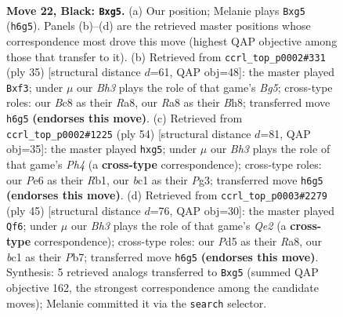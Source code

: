 \documentclass[11pt]{article}
\begin{document}
\clearpage

\begin{figure}[p]\centering
\begin{subfigure}{0.46\textwidth}\centering
\resizebox{\linewidth}{!}{%
\newchessgame
\chessboard[
  setfen={rnbqk3/p7/2p1p1pb/P1PpP1N1/1P3P2/2P5/8/R1BQK1N1 b Qq - 3 22},
  showmover=false,
  pgfstyle=straightmove, color=movearrow, markmove={h6-g5}
]}
\caption{}
\end{subfigure}\hfill
\begin{subfigure}{0.46\textwidth}\centering
\resizebox{\linewidth}{!}{%
\newchessgame
\chessboard[
  setfen={r2qk2b/1p3p2/3p2p1/1P1Pp3/p3P1b1/3P1N2/1Q3PP1/R1B1K3 b Qq - 0 18},
  showmover=false,
  pgfstyle=straightmove, color=movearrow, markmove={g4-f3}
]}
\caption{}
\end{subfigure}
\\[4pt]
\begin{subfigure}{0.46\textwidth}\centering
\resizebox{\linewidth}{!}{%
\newchessgame
\chessboard[
  setfen={5r2/p6k/1p4pp/2pqBpn1/1P5P/P2P2P1/5P2/1R1Q2K1 w - - 0 28},
  showmover=false,
  pgfstyle=straightmove, color=movearrow, markmove={h4-g5}
]}
\caption{}
\end{subfigure}\hfill
\begin{subfigure}{0.46\textwidth}\centering
\resizebox{\linewidth}{!}{%
\newchessgame
\chessboard[
  setfen={r5k1/ppp1q3/3pN1pp/3Pn1b1/2P5/7P/PP2BQP1/R5K1 b - - 0 23},
  showmover=false,
  pgfstyle=straightmove, color=movearrow, markmove={e7-f6}
]}
\caption{}
\end{subfigure}
\caption{\textbf{Move 22, Black: \texttt{Bxg5}.} (a) Our position; Melanie plays \texttt{Bxg5} (\texttt{h6g5}). Panels (b)--(d) are the retrieved master positions whose correspondence most drove this move (highest QAP objective among those that transfer to it). (b) Retrieved from \texttt{ccrl\_top\_p0002\#331} (ply 35) [structural distance $d$=61, QAP obj=48]: the master played \texttt{Bxf3}; under $\mu$ our \emph{Bh3} plays the role of that game's \emph{Bg5}; cross-type roles: our \emph{B}c8 as their \emph{R}a8, our \emph{R}a8 as their \emph{B}h8; transferred move \texttt{h6g5} \textbf{(endorses this move)}. (c) Retrieved from \texttt{ccrl\_top\_p0002\#1225} (ply 54) [structural distance $d$=81, QAP obj=35]: the master played \texttt{hxg5}; under $\mu$ our \emph{Bh3} plays the role of that game's \emph{Ph4} (a \textbf{cross-type} correspondence); cross-type roles: our \emph{P}e6 as their \emph{R}b1, our \emph{b}c1 as their \emph{P}g3; transferred move \texttt{h6g5} \textbf{(endorses this move)}. (d) Retrieved from \texttt{ccrl\_top\_p0003\#2279} (ply 45) [structural distance $d$=76, QAP obj=30]: the master played \texttt{Qf6}; under $\mu$ our \emph{Bh3} plays the role of that game's \emph{Qe2} (a \textbf{cross-type} correspondence); cross-type roles: our \emph{P}d5 as their \emph{R}a8, our \emph{b}c1 as their \emph{P}b7; transferred move \texttt{h6g5} \textbf{(endorses this move)}. Synthesis: 5 retrieved analogs transferred to \texttt{Bxg5} (summed QAP objective 162, the strongest correspondence among the candidate moves); Melanie committed it via the \texttt{search} selector.}
\label{fig:thought-m43}
\end{figure}
\end{document}
